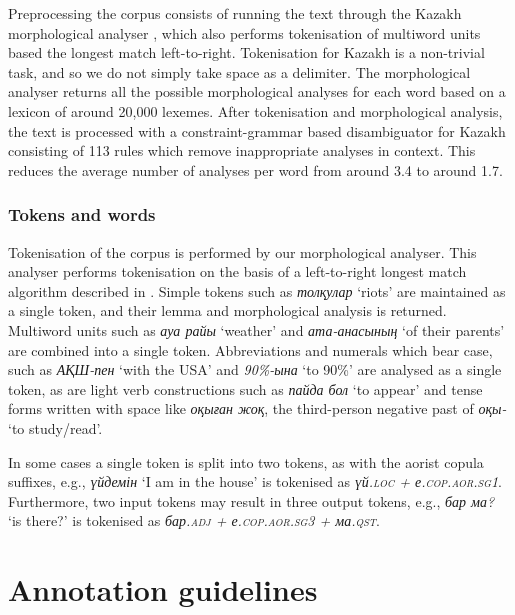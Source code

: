 \documentclass[a4paper,11pt, onecolumn,twoside]{article}
\newcommand{\gmk}[1]{{\rm {\ll \textsc{#1}}}}
\newcommand{\kazakh}[1]{{\em #1}}
\newcommand{\gloss}[1]{`#1'}
\begin{document}
Preprocessing the corpus consists of running the text through the Kazakh morphological
analyser \parencite{Washington14}, which also performs tokenisation of multiword units based 
the longest match left-to-right. Tokenisation for Kazakh is a non-trivial task, and so
we do not simply take space as a delimiter. The morphological analyser returns all 
the possible morphological analyses for each word based on a lexicon of around 20,000 lexemes.
After tokenisation and morphological analysis, the text is processed with a constraint-grammar 
based disambiguator for Kazakh consisting of 113 rules which remove inappropriate 
analyses in context. This reduces the average number of analyses per word from around 3.4
to around 1.7.


\subsubsection{Tokens and words}

Tokenisation of the corpus is performed by our morphological analyser. This analyser
performs tokenisation on the basis of a left-to-right longest match algorithm described
in \textcite{garrido02}. Simple tokens such as \kazakh{толқулар} \gloss{riots} are maintained
as a single token, and their lemma and morphological analysis is returned. Multiword
units such as \kazakh{ауа райы} \gloss{weather} and \kazakh{ата-анасының} \gloss{of their parents} are combined
into a single token. Abbreviations and numerals which bear case, such as \kazakh{АҚШ-пен} \gloss{with the USA}
and \kazakh{90\%-ына} \gloss{to 90\%} are analysed as a single token, as are light verb constructions such as
\kazakh{пайда бол} \gloss{to appear} and tense forms written with space like \kazakh{оқыған жоқ},
the third-person negative past of \kazakh{оқы-} \gloss{to study/read}.

In some cases a single token is split into two tokens, as with the aorist copula suffixes,
e.g., \kazakh{үйдемін} \gloss{I am in the house} is tokenised as \kazakh{үй.\gmk{loc} + е.\gmk{cop.aor.sg1}}. Furthermore,
two input tokens may result in three output tokens, e.g., \kazakh{бар ма?} \gloss{is there?} is
tokenised as \kazakh{бар.\gmk{adj} + е.\gmk{cop.aor.sg3} + ма.\gmk{qst}}.



\section{Annotation guidelines}\label{sec:annotation}
\end{document}
